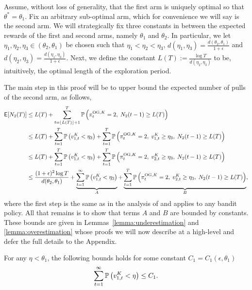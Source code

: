 \begin{myproof}[Proof.]	
	Assume, without loss of generality, that the first arm is uniquely optimal so that $\theta^* = \theta_1$. Fix an arbitrary sub-optimal arm, which for convenience we will say is the second arm. We will strategically fix three constants in between the expected rewards of the first and second arms, namely $\theta_1$ and $\theta_2$. In particular, we let $\eta_1,\eta_2,\eta_3 \in (\theta_2, \theta_1)$ be chosen such that $\eta_1 < \eta_2 < \eta_3$, $d(\eta_1, \eta_3) = \frac{d(\theta_2, \theta_1)}{1+\epsilon}$ and $d(\eta_2,\eta_3) =\frac{d(\eta_1, \eta_3)}{1+\epsilon} $. Next, we define the constant $L(T) := \frac{\log T}{d(\eta_2,\eta_3)}$ to be, intuitively, the optimal length of the exploration period.
	
	The main step in this proof will be to upper bound the expected number of pulls of the second arm, as follows,
	\begin{align}
	\E[N_2(T)] & \le L(T) + \sum_{t=\floor{L(T)}+1}^T \P{\pi^{{\rm OG},K}_t = 2, \; N_2(t-1) \ge L(T)} \nonumber \\
	& \le L(T) +   \sum_{t=1}^T \P{v^K_{1,t} < \eta_3} + \sum_{t=1}^T \P{\pi^{{\rm OG},K}_t = 2,\; v^K_{1,t} \ge \eta_3, \; N_2(t-1) \ge L(T)} \nonumber \\
	& \le L(T) +   \sum_{t=1}^T \P{v^K_{1,t} < \eta_3} + \sum_{t=1}^T \P{\pi^{{\rm OG},K}_t = 2,\; v^K_{2,t} \ge \eta_3, \; N_2(t-1) \ge L(T)} \nonumber \\
	& \le \frac{(1+\epsilon)^2 \log T}{d(\theta_2, \theta_1)} + \underbrace{\sum_{t=1}^\infty \P{v^K_{1,t} < \eta_3}}_{A} + \underbrace{\sum_{t=1}^T \P{\pi^{{\rm OG},K}_t = 2,\;v^K_{2,t} \ge \eta_3, \; N_2(t-1) \ge L(T)}}_{B}, \label{bound:final_step_in_freq_regret}
	\end{align}
	where the first step is the same as in the analysis of \cite{auer2002finite} and applies to any bandit policy. All that remains is to show that terms $A$ and $B$ are bounded by constants. These bounds are given in Lemmas~\ref{lemma:underestimation} and \ref{lemma:overestimation} whose proofs we will now describe at a high-level and defer the full details to the Appendix.
	\begin{lemma} \label{lemma:underestimation}
		For any $\eta < \theta_1$, the following bounds holds for some constant $C_1 = C_1(\epsilon, \theta_1)$
		\begin{equation*}
		\sum_{t=1}^\infty \P{v^K_{1,t} < \eta} \le C_1.
		\end{equation*}
	\end{lemma}

\end{myproof}
